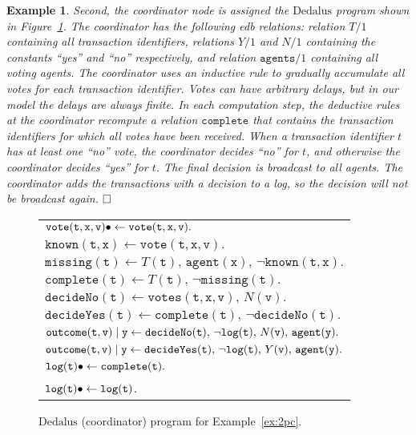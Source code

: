 \documentclass{tlp}
\newtheorem{example}[theorem]{Example}
\newenvironment{cenchop}{\renewcommand{\arraystretch}{1.3}\begin{center}\begin{tabular}{l}}{\end{tabular}\end{center}\renewcommand{\arraystretch}{1}}
\newcommand{\qsp}{\\[1.2ex]}
\newcommand{\qed}{\hfill $\square$}
\newcommand{\langname}[1]{\text{#1}}  \newcommand{\pred}[1]{\mathtt{#1}}  \newcommand{\fname}[1]{\mathit{#1}}  \newcommand{\sq}[1]{`{#1}'}
\newcommand{\dedalus}{\langname{Dedalus}}
\renewcommand{\qed}{$\hfill \square$}  \newcommand{\tline}{\hrulefill}
\newcommand{\rar}[2]{#1/#2}
\newcommand{\var}[1]{\mathtt{#1}}
\begin{document}
\begin{example}
    Second, the coordinator node is assigned the $\dedalus$ program shown in Figure~\ref{fig:2pc}. The coordinator has the following \emph{edb} relations: relation $\rar T1$ containing all transaction identifiers, relations $\rar Y1$ and $\rar N1$ containing the constants ``yes'' and ``no'' respectively, and relation $\rar{\pred{agents}}1$ containing all voting agents.
    The coordinator uses an inductive rule to gradually accumulate all votes for each transaction identifier. Votes can have arbitrary delays, but in our model the delays are always finite.
    In each computation step, the deductive rules at the coordinator recompute a relation $\pred{complete}$ that contains the transaction identifiers for which all votes have been received.
    When a transaction identifier $t$ has at least one ``no'' vote, the coordinator decides ``no'' for $t$, and otherwise the coordinator decides ``yes'' for $t$. The final decision is broadcast to all agents. The coordinator adds the transactions with a decision to a log, so the decision will not be broadcast again.
    \qed
\end{example}

\begin{figure}
    \begin{framed}
    \begin{cenchop}
        $\pred{vote}(\var t, \var x, \var v)\sugind\gets\pred{vote}(\var t,\var x,\var v).$\\
        $\pred{known}(\var t,\var x)\gets\pred{vote}(\var t,\var x,\var v).$\\
        $\pred{missing}(\var t)\gets T(\var t),\, \pred{agent}(\var x),\, \neg\pred{known}(\var t,\var x).$\\
        $\pred{complete}(\var t)\gets T(\var t),\, \neg\pred{missing}(\var t).$\\      
        $\pred{decideNo}(\var t)\gets \pred{votes}(\var t,\var x,\var v),\,N(\var v).$\\
        $\pred{decideYes}(\var t)\gets \pred{complete}(\var t),\,\neg\pred{decideNo}(\var t).$
        \qsp
$\pred{outcome}(\var t,\var v)\sugas\var y \gets \pred{decideNo}(\var t),\, \neg\pred{log}(\var t),\, N(\var v),\, \pred{agent}(\var y).$\\
        $\pred{outcome}(\var t,\var v)\sugas\var y \gets\pred{decideYes}(\var t),\,\neg\pred{log}(\var t),\,Y(\var v),\,\pred{agent}(\var y).$\\
        $\pred{log}(\var t)\sugind\gets\pred{complete}(\var t).$\\
        $\pred{log}(\var t)\sugind\gets\pred{log}(\var t)$.
    \end{cenchop}
    \end{framed}
    \caption{\label{fig:2pc}$\dedalus$ (coordinator) program
    for Example~\ref{ex:2pc}.}
\end{figure}
\end{document}
